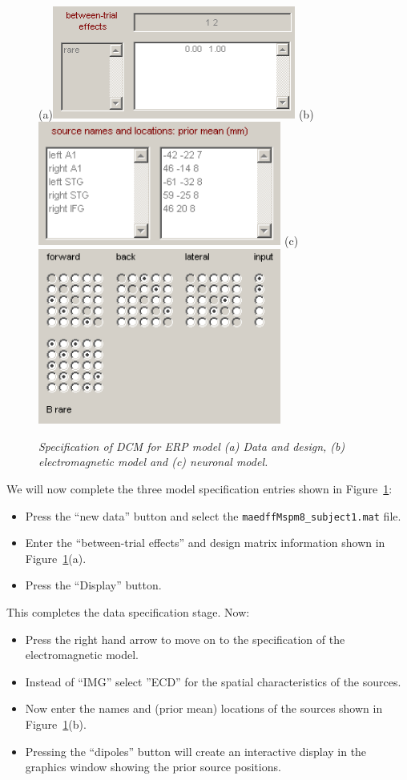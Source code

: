 \begin{figure}
\begin{center}
(a)\includegraphics[width=80mm]{mmn/data_and_design}
(b)\includegraphics[width=80mm]{mmn/electro_model}
(c)\includegraphics[width=80mm]{mmn/neuronal_model}
\caption{\em Specification of DCM for ERP model (a) Data and design, (b) electromagnetic model and (c) neuronal model.
\label{specify} }
\end{center}
\end{figure}
We will now complete the three model specification entries shown in Figure~\ref{specify}:
\begin{itemize}
\item{Press the ``new data'' button and select the \texttt{maedffMspm8\_subject1.mat} file.}
\item{Enter the ``between-trial effects'' and design matrix information shown in Figure~\ref{specify}(a).}
\item{Press the ``Display'' button.}
\end{itemize}
This completes the data specification stage. Now:
\begin{itemize}
\item{Press the right hand arrow to move on to the specification of the electromagnetic model.}
\item{Instead of ``IMG'' select ''ECD'' for the spatial characteristics of the sources.}
\item{Now enter the names and (prior mean) locations of the sources shown in Figure~\ref{specify}(b).}
\item{Pressing the ``dipoles'' button will create an interactive display in the graphics window showing the prior source positions.}
\end{itemize}
